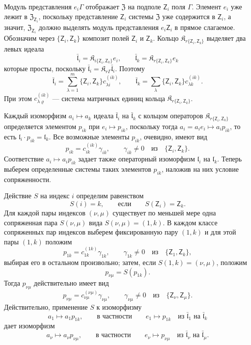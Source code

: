 \documentclass[11pt]{article}
\begin{document}
Модуль представления \(e_i\Gamma\) отображает \(\mathfrak Z\) на подполе \(\mathsf{Z}_i\) поля \(\Gamma\). Элемент \(e_i\) уже лежит в \(\mathfrak Z_{\mathsf{Z}_i}\), поскольку представление \(\mathsf{Z}_i\) системы \(\mathfrak Z\) уже содержится в \(\mathsf{Z}_i\), а значит, \(\mathfrak Z_{\mathsf{Z}_i}\) должно выделять модуль представления \(e_i\mathsf{Z}_i\) в прямое слагаемое. Обозначим через \(\{\mathsf{Z}_i,\mathsf{Z}_k\}\) композит полей \(\mathsf{Z}_i\) и \(\mathsf{Z}_k\). Кольцо \(\mathfrak K_{r\{\mathsf{Z}_i,\mathsf{Z}_k\}}\) выделяет два левых идеала
\[
\bar{\mathfrak l}_i=\mathfrak K_{i\{\mathsf{Z}_i,\mathsf{Z}_k\}}e_i,\qquad
\bar{\mathfrak l}_k=\mathfrak K_{r\{\mathsf{Z}_i,\mathsf{Z}_k\}}e_k
\]
которые просты, поскольку \(\bar{\mathfrak l}_i=\mathfrak K_{r\Gamma}\bar{\mathfrak l}_i\). Поэтому
\[
\bar{\mathfrak l}_i=\sum_{\lambda=1}^m\{\mathsf{Z}_i,\mathsf{Z}_k\}c_{\lambda i}^{(ik)},\qquad
\bar{\mathfrak l}_k=\sum_{\lambda}\{\mathsf{Z}_i,\mathsf{Z}_k\}c_{\lambda k}^{(ik)}.
\]
При этом \(c_{\lambda\varrho}^{(ik)}\) --- система матричных единиц кольца \(\mathfrak K_{r\{\mathsf{Z}_i,\mathsf{Z}_k\}}\).

Каждый изоморфизм \(a_i\mapsto a_k\) идеала \(\bar{\mathfrak l}_i\) на \(\bar{\mathfrak l}_k\) с кольцом операторов \(\mathfrak K_{r\{\mathsf{Z}_i,\mathsf{Z}_k\}}\) определяется элементом \(p_{ik}\) при \(e_i\mapsto p_{ik}\), поскольку тогда \(a_i=a_ie_i\mapsto a_ip_{ik}\), то есть \(\mathfrak l_i\cdot p_{ik}=\mathfrak l_k\). Все возможные элементы \(p_{ik}\), очевидно, имеют вид
\[
p_{ik}=c_{ik}^{(ik)}\gamma_{ik},\qquad \gamma_{ik}\ne0\quad\text{из}\quad \{\mathsf{Z}_i,\mathsf{Z}_k\}.
\]
Соответствие \(a_i\mapsto a_ip_{ik}\) задает также операторный изоморфизм \(\mathfrak l_i\) на \(\mathfrak l_k\). Теперь выберем определенные системы таких элементов \(p_{ik}\), наложив на них условие сопряженности.

Действие \(S\) на индекс \(i\) определим равенством
\[
S(i)=k,\qquad\text{если}\qquad S(\mathsf{Z}_i)=\mathsf{Z}_k.
\]
Для каждой пары индексов \((\nu,\mu)\) существует по меньшей мере одна сопряженная пара \(S(\nu,\mu)\) вида \(S(\nu,\mu)=(1,k)\). В каждом классе сопряженных пар индексов выберем фиксированную пару \((1,k)\) и для этой пары \((1,k)\) положим
\[
p_{1k}=c_{1k}^{(1k)}\gamma_{1k},\qquad \gamma_{1k}\ne0\quad\text{из}\quad \{\mathsf{Z}_1,\mathsf{Z}_k\},
\]
выбирая его в остальном произвольно; затем, если \(S(1,k)=(\nu,\mu)\), положим
\[
p_{\nu\mu}=S(p_{1k}).
\]
Тогда \(p_{\nu\mu}\) действительно имеет вид
\[
p_{\nu\mu}=c_{\nu\mu}^{(\nu\mu)}\gamma_{\nu\mu},\qquad
\gamma_{\nu\mu}\ne0\quad\text{из}\quad \{\mathsf{Z}_\nu,\mathsf{Z}_\mu\}.
\]
Действительно, применение \(S\) к изоморфизму
\[
a_1\mapsto a_1p_{1k},\qquad\text{в частности}\qquad e_1\mapsto p_{1k}
\quad\text{из }\bar{\mathfrak l}_1\text{ на }\bar{\mathfrak l}_k
\]
дает изоморфизм
\[
a_\nu\mapsto a_\nu p_{\nu\mu},\qquad\text{в частности}\qquad e_\nu\mapsto p_{\nu\mu}
\quad\text{из }\bar{\mathfrak l}_\nu\text{ на }\bar{\mathfrak l}_\mu.
\]
\end{document}
